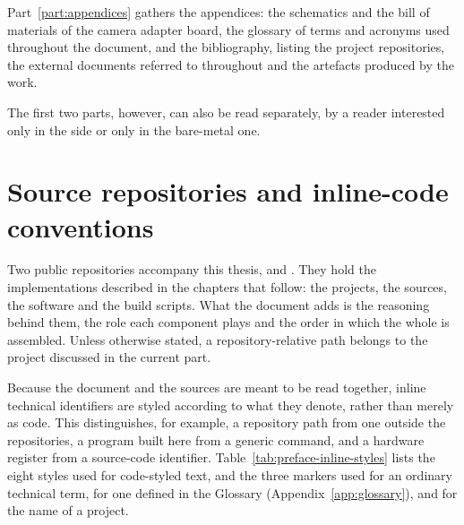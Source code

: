 Part~\ref{part:appendices} gathers the appendices: the schematics and the bill of materials of the camera adapter board, the glossary of terms and acronyms used throughout the document, and the bibliography, listing the project repositories, the external documents referred to throughout and the artefacts produced by the work.

The first two parts, however, can also be read separately, by a reader interested only in the  side or only in the bare-metal one.

\section{Source repositories and inline-code conventions}

Two public repositories accompany this thesis, \cite{FPGALIX-REPO} and \cite{FPGASTEEL-REPO}. They hold the implementations described in the chapters that follow: the  projects, the  sources, the  software and the  build scripts. What the document adds is the reasoning behind them, the role each component plays and the order in which the whole is assembled. Unless otherwise stated, a repository-relative path belongs to the project discussed in the current part.

Because the document and the sources are meant to be read together, inline technical identifiers are styled according to what they denote, rather than merely as code. This distinguishes, for example, a repository path from one outside the repositories, a program built here from a generic command, and a hardware register from a source-code identifier. Table~\ref{tab:preface-inline-styles} lists the eight styles used for code-styled text, and the three markers used for an ordinary technical term, for one defined in the Glossary (Appendix~\ref{app:glossary}), and for the name of a project.

